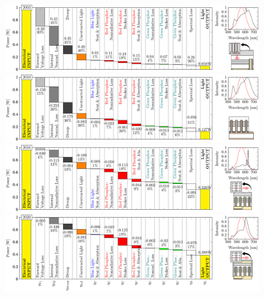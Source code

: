 \documentclass[parskip=full]{article}
\begin{document}
\begin{figure}[H]
 \centering
 \includegraphics[width=15.5cm]{figures/waterfall_performance_2003.pdf}
 \includegraphics[width=15.5cm]{figures/waterfall_performance_2010.pdf}
 \includegraphics[width=15.5cm]{figures/waterfall_performance_2016.pdf}
 \includegraphics[width=15.5cm]{figures/waterfall_performance_2020.pdf}
 \captionsetup{font=footnotesize}

\end{figure}
\end{document}
